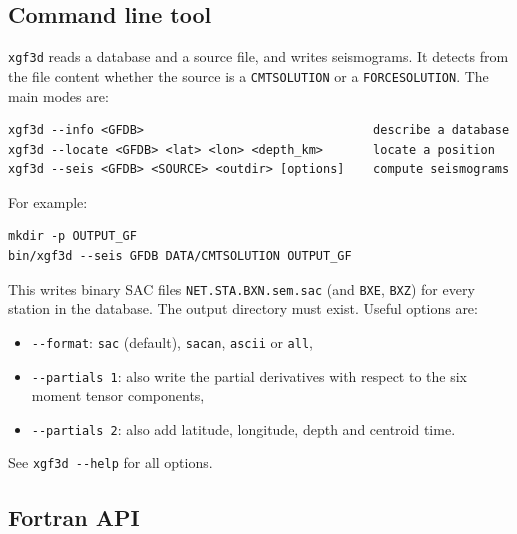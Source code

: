 \subsection{Command line tool}

\texttt{xgf3d} reads a database and a source file, and writes seismograms.
It detects from the file content whether the source is a \texttt{CMTSOLUTION}
or a \texttt{FORCESOLUTION}. The main modes are:
\begin{verbatim}
xgf3d --info <GFDB>                                describe a database
xgf3d --locate <GFDB> <lat> <lon> <depth_km>       locate a position
xgf3d --seis <GFDB> <SOURCE> <outdir> [options]    compute seismograms
\end{verbatim}
For example:
\begin{verbatim}
mkdir -p OUTPUT_GF
bin/xgf3d --seis GFDB DATA/CMTSOLUTION OUTPUT_GF
\end{verbatim}
This writes binary SAC files \texttt{NET.STA.BXN.sem.sac} (and \texttt{BXE},
\texttt{BXZ}) for every station in the database. The output directory must exist.
Useful options are:
\begin{itemize}
\item \texttt{-{}-format}: \texttt{sac} (default), \texttt{sacan}, \texttt{ascii} or \texttt{all},
\item \texttt{-{}-partials 1}: also write the partial derivatives with respect to
  the six moment tensor components,
\item \texttt{-{}-partials 2}: also add latitude, longitude, depth and centroid time.
\end{itemize}
See \texttt{xgf3d -{}-help} for all options.

\subsection{Fortran API}

